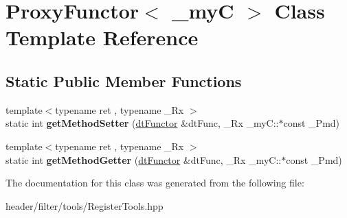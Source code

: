 \hypertarget{class_proxy_functor}{}\section{Proxy\+Functor$<$ \+\_\+myC $>$ Class Template Reference}
\label{class_proxy_functor}
\subsection*{Static Public Member Functions}
\begin{DoxyCompactItemize}
\item 
\mbox{\label{class_proxy_functor_ad7cee17359c8dfc4e2e071139eaa2485}} 
{\footnotesize template$<$typename ret , typename \+\_\+\+Rx $>$ }\\static int {\bfseries get\+Method\+Setter} (\hyperlink{classdt_functor}{dt\+Functor} \&dt\+Func, \+\_\+\+Rx \+\_\+my\+C\+::$\ast$const \+\_\+\+Pmd)
\item 
\mbox{\label{class_proxy_functor_a2d96960651f83e591bfb8c9cdfabfc9d}} 
{\footnotesize template$<$typename ret , typename \+\_\+\+Rx $>$ }\\static int {\bfseries get\+Method\+Getter} (\hyperlink{classdt_functor}{dt\+Functor} \&dt\+Func, \+\_\+\+Rx \+\_\+my\+C\+::$\ast$const \+\_\+\+Pmd)
\end{DoxyCompactItemize}


The documentation for this class was generated from the following file\+:\begin{DoxyCompactItemize}
\item 
header/filter/tools/Register\+Tools.\+hpp\end{DoxyCompactItemize}
